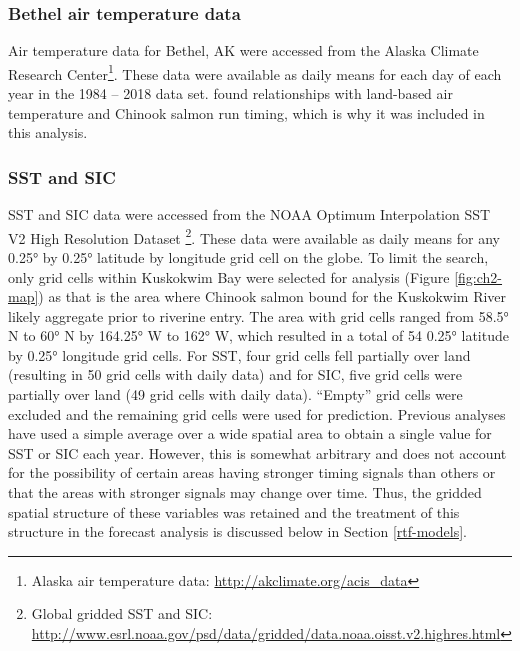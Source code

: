\documentclass[12pt,]{book}
\let\rmarkdownfootnote\footnote%
\def\footnote{\protect\rmarkdownfootnote}
\theoremstyle{definition}
\theoremstyle{definition}
\theoremstyle{definition}
\theoremstyle{remark}
\begin{document}
\subsubsection{Bethel air temperature
data}\label{bethel-air-temperature-data}

\noindent
Air temperature data for Bethel, AK were accessed from the Alaska
Climate Research Center\footnote{Alaska air temperature data:
  \url{http://akclimate.org/acis_data}}. These data were available as
daily means for each day of each year in the 1984 -- 2018 data set.
\citet{mundy-evenson-2011} found relationships with land-based air
temperature and Chinook salmon run timing, which is why it was included
in this analysis.

\subsubsection{SST and SIC}\label{sst-and-sic}

\noindent
SST and SIC data were accessed from the NOAA Optimum Interpolation SST
V2 High Resolution Dataset \citep{reynolds-etal-2007}\footnote{Global
  gridded SST and SIC:
  \url{http://www.esrl.noaa.gov/psd/data/gridded/data.noaa.oisst.v2.highres.html}}.
These data were available as daily means for any 0.25° by 0.25° latitude
by longitude grid cell on the globe. To limit the search, only grid
cells within Kuskokwim Bay were selected for analysis (Figure
\ref{fig:ch2-map}) as that is the area where Chinook salmon bound for
the Kuskokwim River likely aggregate prior to riverine entry. The area
with grid cells ranged from 58.5° N to 60° N by 164.25° W to 162° W,
which resulted in a total of 54 0.25° latitude by 0.25° longitude grid
cells. For SST, four grid cells fell partially over land (resulting in
50 grid cells with daily data) and for SIC, five grid cells were
partially over land (49 grid cells with daily data). ``Empty'' grid
cells were excluded and the remaining grid cells were used for
prediction. Previous analyses have used a simple average over a wide
spatial area \citep[\emph{e}.\emph{g}.,][]{mundy-evenson-2011} to obtain
a single value for SST or SIC each year. However, this is somewhat
arbitrary and does not account for the possibility of certain areas
having stronger timing signals than others or that the areas with
stronger signals may change over time. Thus, the gridded spatial
structure of these variables was retained and the treatment of this
structure in the forecast analysis is discussed below in Section
\ref{rtf-models}.
\end{document}
